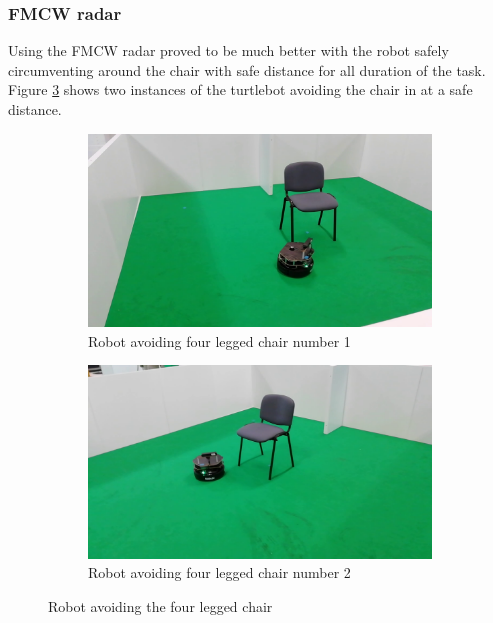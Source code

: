 \subsubsection*{FMCW radar}
Using the \ac{FMCW} radar proved to be much better with the robot safely circumventing around the chair with safe distance for all duration of the task. Figure \ref{fig:nchairRS} shows two instances of the turtlebot avoiding the chair in at a safe distance.
\begin{figure}[h!]
  \centering
  \begin{subfigure}[b]{0.49\linewidth}
    \includegraphics[width=\linewidth]{imgs/chapter5/nchairRS.png}
     \caption{Robot avoiding four legged chair number 1}
     \label{fig::nchairRS1}
  \end{subfigure}
  \begin{subfigure}[b]{0.49\linewidth}
    \includegraphics[width=\linewidth]{imgs/chapter5/nchairRS2.png}
    \caption{Robot avoiding four legged chair number 2}
    \label{fig::nchairRS2}
  \end{subfigure}
  \caption{Robot avoiding the four legged chair}
  \label{fig:nchairRS}
\end{figure}

